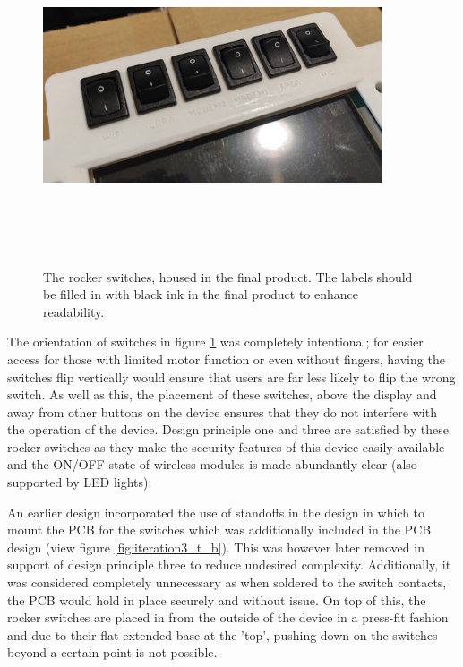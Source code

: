 \begin{figure} [h]
    \centering
    \includegraphics[width=10cm,height=10cm,keepaspectratio]{Figures/hardware_switches.png}
    \caption{The rocker switches, housed in the final product. The labels should be filled in with black ink in the final product to enhance readability.}
    \label{fig:Switches}
\end{figure}

The orientation of switches in figure \ref{fig:Switches} was completely intentional; for easier access for those with limited motor function or even without fingers, having the switches flip vertically would ensure that users are far less likely to flip the wrong switch.
As well as this, the placement of these switches, above the display and away from other buttons on the device ensures that they do not interfere with the operation of the device.
Design principle one and three are satisfied by these rocker switches as they make the security features of this device easily available and the ON/OFF state of wireless modules is made abundantly clear (also supported by LED lights).

An earlier design incorporated the use of standoffs in the design in which to mount the PCB for the switches which was additionally included in the PCB design (view figure \ref{fig:iteration3_t_b}).
This was however later removed in support of design principle three to reduce undesired complexity.
Additionally, it was considered completely unnecessary as when soldered to the switch contacts, the PCB would hold in place securely and without issue.
On top of this, the rocker switches are placed in from the outside of the device in a press-fit fashion and due to their flat extended base at the 'top', pushing down on the switches beyond a certain point is not possible.

